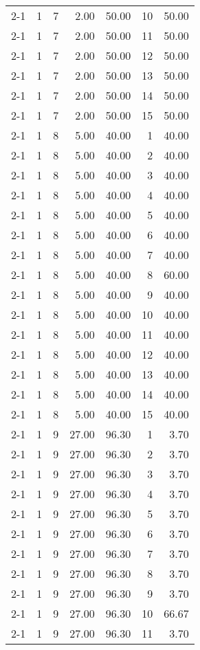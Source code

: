 \begin{tabular}{lrrrrrr}
2-1  & 1 & 7 & 2.00 & 50.00 & 10 & 50.00 \\
2-1  & 1 & 7 & 2.00 & 50.00 & 11 & 50.00 \\
2-1  & 1 & 7 & 2.00 & 50.00 & 12 & 50.00 \\
2-1  & 1 & 7 & 2.00 & 50.00 & 13 & 50.00 \\
2-1  & 1 & 7 & 2.00 & 50.00 & 14 & 50.00 \\
2-1  & 1 & 7 & 2.00 & 50.00 & 15 & 50.00 \\
2-1  & 1 & 8 & 5.00 & 40.00 & 1 & 40.00 \\
2-1  & 1 & 8 & 5.00 & 40.00 & 2 & 40.00 \\
2-1  & 1 & 8 & 5.00 & 40.00 & 3 & 40.00 \\
2-1  & 1 & 8 & 5.00 & 40.00 & 4 & 40.00 \\
2-1  & 1 & 8 & 5.00 & 40.00 & 5 & 40.00 \\
2-1  & 1 & 8 & 5.00 & 40.00 & 6 & 40.00 \\
2-1  & 1 & 8 & 5.00 & 40.00 & 7 & 40.00 \\
2-1  & 1 & 8 & 5.00 & 40.00 & 8 & 60.00 \\
2-1  & 1 & 8 & 5.00 & 40.00 & 9 & 40.00 \\
2-1  & 1 & 8 & 5.00 & 40.00 & 10 & 40.00 \\
2-1  & 1 & 8 & 5.00 & 40.00 & 11 & 40.00 \\
2-1  & 1 & 8 & 5.00 & 40.00 & 12 & 40.00 \\
2-1  & 1 & 8 & 5.00 & 40.00 & 13 & 40.00 \\
2-1  & 1 & 8 & 5.00 & 40.00 & 14 & 40.00 \\
2-1  & 1 & 8 & 5.00 & 40.00 & 15 & 40.00 \\
2-1  & 1 & 9 & 27.00 & 96.30 & 1 & 3.70 \\
2-1  & 1 & 9 & 27.00 & 96.30 & 2 & 3.70 \\
2-1  & 1 & 9 & 27.00 & 96.30 & 3 & 3.70 \\
2-1  & 1 & 9 & 27.00 & 96.30 & 4 & 3.70 \\
2-1  & 1 & 9 & 27.00 & 96.30 & 5 & 3.70 \\
2-1  & 1 & 9 & 27.00 & 96.30 & 6 & 3.70 \\
2-1  & 1 & 9 & 27.00 & 96.30 & 7 & 3.70 \\
2-1  & 1 & 9 & 27.00 & 96.30 & 8 & 3.70 \\
2-1  & 1 & 9 & 27.00 & 96.30 & 9 & 3.70 \\
2-1  & 1 & 9 & 27.00 & 96.30 & 10 & 66.67 \\
2-1  & 1 & 9 & 27.00 & 96.30 & 11 & 3.70 \\

\end{tabular}
